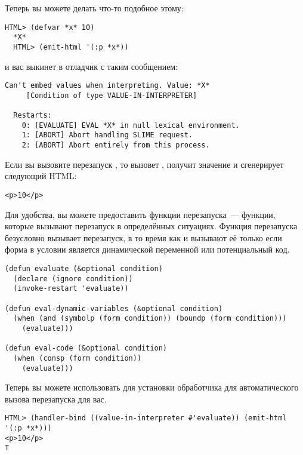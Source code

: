 Теперь вы можете делать что-то подобное этому:

\begin{lstlisting}[style=lisprepl]
  HTML> (defvar *x* 10)
  *X*
  HTML> (emit-html '(:p *x*))
\end{lstlisting}

и вас выкинет в отладчик с таким сообщением:

\begin{lstlisting}[style=lisprepl]
  Can't embed values when interpreting. Value: *X*
     [Condition of type VALUE-IN-INTERPRETER]

  Restarts:
    0: [EVALUATE] EVAL *X* in null lexical environment.
    1: [ABORT] Abort handling SLIME request.
    2: [ABORT] Abort entirely from this process.
\end{lstlisting}

Если вы вызовите перезапуск , то  вызовет , получит значение  и сгенерирует следующий HTML:

\begin{lstlisting}[style=lisprepl]
  <p>10</p>
\end{lstlisting}

Для удобства, вы можете предоставить функции перезапуска~--- функции, которые вызывают
 перезапуск в определённых ситуациях. Функция  перезапуска
безусловно вызывает перезапуск, в то время как  и
 вызывают её только если форма в условии является динамической переменной
или потенциальный код.

\begin{lstlisting}
(defun evaluate (&optional condition)
  (declare (ignore condition))
  (invoke-restart 'evaluate))

(defun eval-dynamic-variables (&optional condition)
  (when (and (symbolp (form condition)) (boundp (form condition)))
    (evaluate)))

(defun eval-code (&optional condition)
  (when (consp (form condition))
    (evaluate)))
\end{lstlisting}

Теперь вы можете использовать  для установки обработчика для
автоматического вызова  перезапуска для вас.

\begin{lstlisting}
HTML> (handler-bind ((value-in-interpreter #'evaluate)) (emit-html '(:p *x*)))
<p>10</p>
T
\end{lstlisting}

